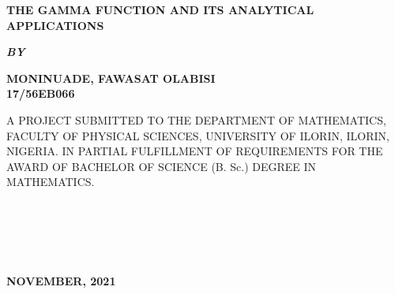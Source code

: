 \documentclass[11pt]{report}
\newcommand{\sps}{\\[0.2cm]}
\newcommand{\bt}[1]{\textbf{#1}}
\begin{document}
	
	\clearpage
	\thispagestyle{empty}
	\begin{center}
		\Large \bt{THE GAMMA FUNCTION AND ITS ANALYTICAL APPLICATIONS}
	\end{center}

	\hspace{7cm}
	
	\begin{center}
		\textbf{\textit{BY}}
	\end{center}
	
	\hspace{5cm}
	
	\begin{center}
		\large \textbf{MONINUADE, FAWASAT OLABISI
			\\
			17/56EB066}
	\end{center}
	
	\hspace{9cm}
	
	\begin{center}
		A PROJECT SUBMITTED TO THE DEPARTMENT OF MATHEMATICS, FACULTY OF PHYSICAL SCIENCES, UNIVERSITY OF ILORIN, ILORIN, NIGERIA. IN PARTIAL FULFILLMENT OF REQUIREMENTS FOR THE AWARD OF BACHELOR OF SCIENCE (B. Sc.) DEGREE IN MATHEMATICS.
	\end{center}

	\hspace{7cm}
~~~~\sps\sps
	\\ \\ 
	\begin{center}
		\textbf{NOVEMBER, 2021}
	\end{center}

	\newpage
\end{document}
